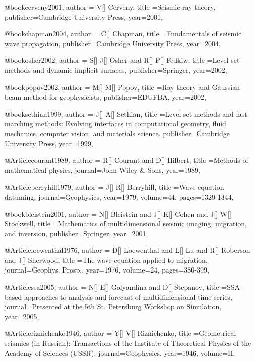 {@book{cerveny2001,
  author = {V[] Cerveny},
  title ={Seismic ray theory},
  publisher={Cambridge University Press},
  year=2001,
}

@book{chapman2004,
  author = {C[] Chapman},
  title ={Fundamentals of seismic wave propagation},
  publisher={Cambridge University Press},
  year=2004,
}

@book{osher2002,
  author = {S[] J[] Osher and R[] P[] Fedkiw},
  title ={Level set methods and dynamic implicit surfaces},
  publisher={Springer},
  year=2002,
}

@book{popov2002,
  author = {M[] M[] Popov},
  title ={Ray theory and Gaussian beam method for geophysicists},
  publisher={EDUFBA},
  year=2002,
}

@book{sethian1999,
  author = {J[] A[] Sethian},
  title ={Level set methods and fast marching methods: Evolving interfaces in computational geometry, fluid mechanics, computer vision, and materials science},
  publisher={Cambridge University Press},
  year=1999,
}

@Article{courant1989,
  author = {R[] Courant and D[] Hilbert},
  title ={Methods of mathematical physics},
  journal={John Wiley \& Sons},
  year=1989,
}

@Article{berryhill1979,
  author = {J[] R[] Berryhill},
  title ={Wave equation datuming},
  journal={Geophysics},
  year=1979,
  volume=44,
  pages={1329-1344},
}

@book{bleistein2001,
  author = {N[] Bleistein and J[] K[] Cohen and J[] W[] Stockwell},
  title ={Mathematics of multidimensional seismic imaging, migration, and inversion},
  publisher={Springer},
  year=2001,
}

@Article{loewenthal1976,
  author = {D[] Loewenthal and L[] Lu and R[] Roberson and J[] Sherwood},
  title ={The wave equation applied to migration},
  journal={Geophys. Prosp.},
  year=1976,
  volume=24,
  pages={380-399},
}

@Article{ssa2005,
  author = {N[] E[] Golyandina and D[] Stepanov},
  title ={SSA-based approaches to analysis and forecast of multidimensional time series},
  journal={Presented at the 5th St. Petersburg Workshop on Simulation},
  year=2005,
}



@Article{riznichenko1946,
  author = {Y[] V[] Riznichenko},
  title ={Geometrical seismics (in Russian): Transactions of the Institute of Theoretical Physics of the Academy of Sciences (USSR)},
  journal={Geophysics},
  year=1946,
  volume=II,
}

}
